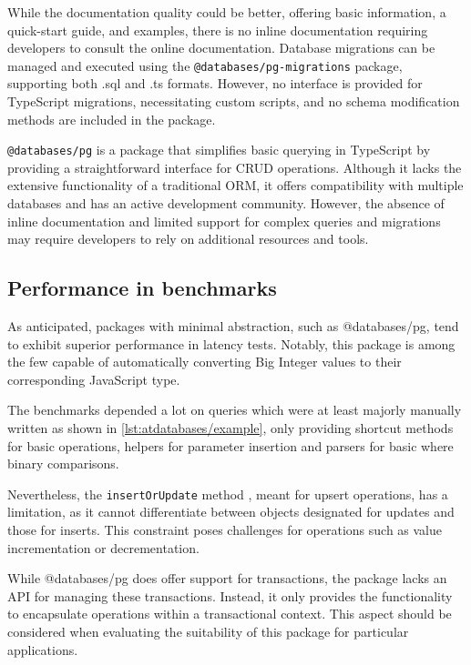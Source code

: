 While the documentation quality could be better, offering basic information, a
quick-start guide, and examples, there is no inline documentation requiring
developers to consult the online documentation. Database migrations can be
managed and executed using the \texttt{@databases/pg-migrations} package,
supporting both .sql and .ts formats. However, no interface is provided for
TypeScript migrations, necessitating custom scripts, and no schema modification
methods are included in the package.

\texttt{@databases/pg} is a package that simplifies basic querying in TypeScript
by providing a straightforward interface for CRUD operations. Although it lacks
the extensive functionality of a traditional ORM, it offers compatibility with
multiple databases and has an active development community. However, the absence
of inline documentation and limited support for complex queries and migrations
may require developers to rely on additional resources and tools.

\subsection*{Performance in benchmarks}
As anticipated, packages with minimal abstraction, such as @databases/pg, tend
to exhibit superior performance in latency tests. Notably, this package is among
the few capable of automatically converting Big Integer values to their
corresponding JavaScript type.

The benchmarks depended a lot on queries which were at least majorly manually
written as shown in \autoref{lst:atdatabases/example}, only providing shortcut
methods for basic operations, helpers for parameter insertion and parsers for
basic where binary comparisons.

Nevertheless, the \texttt{insertOrUpdate} method \cite{databases/pg}, meant for
upsert operations, has a limitation, as it cannot differentiate between objects
designated for updates and those for inserts. This constraint poses challenges
for operations such as value incrementation or decrementation.

While @databases/pg does offer support for transactions, the package lacks an
API for managing these transactions. Instead, it only provides the functionality
to encapsulate operations within a transactional context. This aspect should be
considered when evaluating the suitability of this package for particular
applications.
